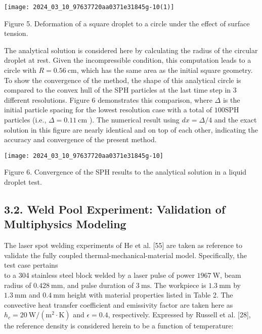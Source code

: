 \documentclass[10pt]{article}
\begin{document}
\begin{center}
\texttt{[image: 2024\_03\_10\_97637720aa0371e31845g-10(1)]}
\end{center}

Figure 5. Deformation of a square droplet to a circle under the effect of surface tension.

The analytical solution is considered here by calculating the radius of the circular droplet at rest. Given the incompressible condition, this computation leads to a circle with $R=0.56 \mathrm{~cm}$, which has the same area as the initial square geometry. To show the convergence of the method, the shape of this analytical circle is compared to the convex hull of the SPH particles at the last time step in 3 different resolutions. Figure 6 demonstrates this comparison, where $\Delta$ is the initial particle spacing for the lowest resolution case with a total of $100 \mathrm{SPH}$ particles (i.e., $\Delta=0.11 \mathrm{~cm}$ ). The numerical result using $d x=\Delta / 4$ and the exact solution in this figure are nearly identical and on top of each other, indicating the accuracy and convergence of the present method.

\begin{center}
\texttt{[image: 2024\_03\_10\_97637720aa0371e31845g-10]}
\end{center}

Figure 6. Convergence of the SPH results to the analytical solution in a liquid droplet test.

\subsection*{3.2. Weld Pool Experiment: Validation of Multiphysics Modeling}
The laser spot welding experiments of He et al. [55] are taken as reference to validate the fully coupled thermal-mechanical-material model. Specifically, the test case pertains\\
to a 304 stainless steel block welded by a laser pulse of power $1967 \mathrm{~W}$, beam radius of $0.428 \mathrm{~mm}$, and pulse duration of $3 \mathrm{~ms}$. The workpiece is $1.3 \mathrm{~mm}$ by $1.3 \mathrm{~mm}$ and $0.4 \mathrm{~mm}$ height with material properties listed in Table 2. The convective heat transfer coefficient and emissivity factor are taken here as $h_{c}=20 \mathrm{~W} /\left(\mathrm{m}^{2} \cdot \mathrm{K}\right)$ and $\epsilon=0.4$, respectively. Expressed by Russell et al. [28], the reference density is considered herein to be a function of temperature:
\end{document}
